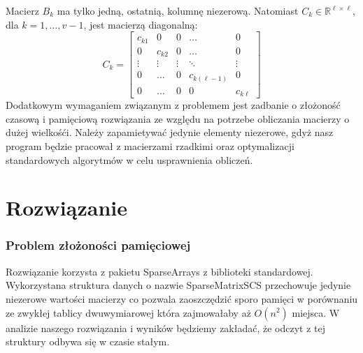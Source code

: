 \documentclass{article}
\begin{document}
	Macierz $B_k$ ma tylko jedną, ostatnią, kolumnę niezerową. Natomiast $C_k \in \mathbb{R}^{\ell \times \ell}$, dla $k = 1, \ldots, v - 1$, jest macierzą diagonalną:\\
	\[
	C_k = \begin{bmatrix}
	    c_{k1} & 0 & 0 & \dots & 0 \\
	    0 & c_{k2} & 0 & \dots & 0 \\
	    \vdots & \vdots & \vdots & \ddots & \vdots \\
	    0 & \dots & 0 & c_{k(\ell-1)} & 0 \\
	    0 & \dots & 0 & 0 & c_{k\ell}
	\end{bmatrix}
	\]
	Dodatkowym wymaganiem związanym z problemem jest zadbanie o złożoność czasową i pamięciową rozwiązania ze względu na potrzebe obliczania macierzy o dużej wielkośći. Należy zapamietywać jedynie elementy niezerowe, gdyż nasz program będzie pracował z macierzami rzadkimi oraz optymalizacji standardowych algorytmów w celu usprawnienia obliczeń.

\section*{Rozwiązanie}
\subsubsection*{Problem złożoności pamięciowej}
	Rozwiązanie korzysta z pakietu SparseArrays z biblioteki standardowej. Wykorzystana struktura danych o nazwie SparseMatrixSCS przechowuje jedynie niezerowe wartości macierzy co pozwala zaoszczędzić sporo pamięci w porównaniu ze zwykłej tablicy dwuwymiarowej która zajmowałaby aż $O(n^2)$ miejsca. W analizie naszego rozwiązania i wyników będziemy zakładać, że odczyt z tej struktury odbywa się w czasie stałym.
\end{document}
